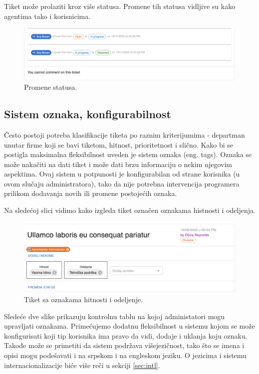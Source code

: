 \documentclass[12pt,oneside]{memoir}
\begin{document}
Tiket može prolaziti kroz više statusa. Promene tih statusa vidljive su kako agentima tako i korisnicima.

\begin{figure}[h]
  \centering
  \includegraphics[width=1\textwidth]{docs/images/ch_1/ticket-statuses.png} 
  \caption{Promene statusa.}
\end{figure}

\subsection{Sistem oznaka, konfigurabilnost}
\label{sec:tagsystem}

Često postoji potreba klasifikacije tiketa po raznim kriterijumima - departman unutar firme koji se bavi tiketom, hitnost, prioritetnost i slično. Kako bi se postigla maksimalna fleksibilnost uveden je sistem oznaka (eng. tags). Oznaka se može nakačiti na dati tiket i može dati brzu informaciju o nekim njegovim aspektima. Ovaj sistem u potpunosti je konfigurabilan od strane korisnika (u ovom slučaju administratora), tako da nije potrebna intervencija programera prilikom dodavanja novih ili promene postojećih oznaka.

Na sledećoj slici vidimo kako izgleda tiket označen oznakama histnosti i odeljenja.

\begin{figure}[h]
  \centering
  \includegraphics[width=1\textwidth]{docs/images/ch_1/tagged-ticket.png} 
  \caption{Tiket sa oznakama hitnosti i odeljenje.}
\end{figure}

Sledeće dve slike prikazuju kontrolnu tablu na kojoj administatori mogu upravljati oznakama. Primećujemo dodatnu fleksibilnost u sistemu kojom se može konfigurisati koji tip korisnika ima pravo da vidi, dodaje i uklanja koju oznaku. Takođe može se primetiti da sistem podržava višejezičnost, tako što se imena i opisi mogu podešavati i na srpskom i na engleskom jeziku. O jezicima i sistemu internacionalizacije biće više reči u sekciji \ref{sec:intl}.
\end{document}

